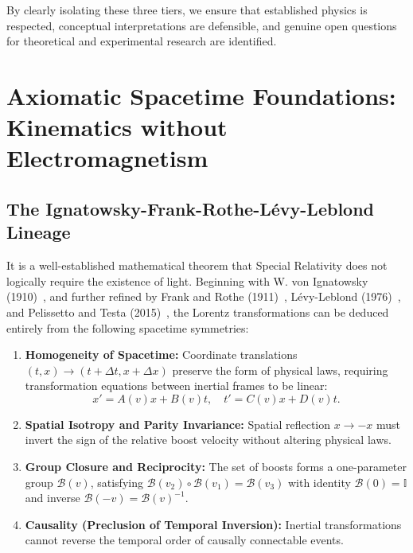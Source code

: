 \documentclass[11pt,a4paper]{article}
\begin{document}
By clearly isolating these three tiers, we ensure that established physics is respected, conceptual interpretations are defensible, and genuine open questions for theoretical and experimental research are identified.

\section{Axiomatic Spacetime Foundations: Kinematics without Electromagnetism}

\subsection{The Ignatowsky-Frank-Rothe-L\'evy-Leblond Lineage}

It is a well-established mathematical theorem that Special Relativity does not logically require the existence of light. Beginning with W. von Ignatowsky (1910)~\cite{ignatowsky1910}, and further refined by Frank and Rothe (1911)~\cite{frank1911}, L\'evy-Leblond (1976)~\cite{levyleblond1976}, and Pelissetto and Testa (2015)~\cite{pelissetto2015}, the Lorentz transformations can be deduced entirely from the following spacetime symmetries:
\begin{enumerate}
    \item \textbf{Homogeneity of Spacetime:} Coordinate translations $(t, x) \to (t + \Delta t, x + \Delta x)$ preserve the form of physical laws, requiring transformation equations between inertial frames to be linear:
    \begin{equation}
    x' = A(v) x + B(v) t, \quad t' = C(v) x + D(v) t.
    \end{equation}
    \item \textbf{Spatial Isotropy and Parity Invariance:} Spatial reflection $x \to -x$ must invert the sign of the relative boost velocity without altering physical laws.
    \item \textbf{Group Closure and Reciprocity:} The set of boosts forms a one-parameter group $\mathcal{B}(v)$, satisfying $\mathcal{B}(v_2) \circ \mathcal{B}(v_1) = \mathcal{B}(v_3)$ with identity $\mathcal{B}(0) = \mathbb{I}$ and inverse $\mathcal{B}(-v) = \mathcal{B}(v)^{-1}$.
    \item \textbf{Causality (Preclusion of Temporal Inversion):} Inertial transformations cannot reverse the temporal order of causally connectable events.
\end{enumerate}
\end{document}
